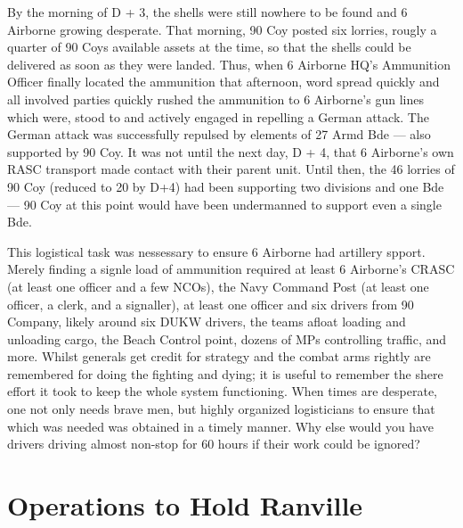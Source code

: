 \documentclass[noraggedright]{turabian-researchpaper}
\begin{document}
By the morning of D + 3, the shells were still nowhere to be found and 6
Airborne growing desperate. That morning, 90 Coy posted six 
lorries, rougly a quarter of 90 Coys available assets at the time, so that
the shells could be delivered as soon as they were landed.\autocite[7]{90wdjun}
Thus, when 6 Airborne HQ's Ammunition Officer finally located the ammunition 
that afternoon, word spread quickly and all involved parties quickly rushed 
the ammunition to 6 Airborne's gun lines which were, stood to and actively 
engaged in repelling a German attack.\autocite[7-8]{90wdjun} %
The German attack was successfully repulsed
by elements of 27 Armd Bde --- also supported by 90 Coy.  It was not until 
the next day, D + 4, that 6 Airborne's own RASC transport made contact with
their parent unit.  Until then, the 46 lorries of 90 Coy 
(reduced %
to 20 by D+4) had been supporting two divisions and one Bde --- 90 Coy
at this point would have been undermanned to support even a single Bde.  

This logistical task was nessessary to ensure 6 Airborne had artillery 
spport.  Merely finding a signle load of ammunition required
at least 6 Airborne's CRASC (at least one officer and a few NCOs), the Navy
Command Post (at least one officer, a clerk, and a signaller), at least one
officer and six drivers from 90 Company, likely around six DUKW drivers, the
teams afloat loading and unloading cargo, the Beach Control point, dozens of 
MPs controlling traffic, and more.  Whilst generals get credit for strategy
and the combat arms rightly are remembered for doing the fighting and dying;
it is useful to remember the shere effort it took to keep the whole system
functioning.  When times are 
desperate, one not only needs brave men, but highly organized logisticians to 
ensure that which was needed was obtained in a timely manner. 
Why else would you have drivers 
driving almost non-stop for 60 hours if their work could be ignored?



\section{Operations to Hold Ranville} %
\end{document}
